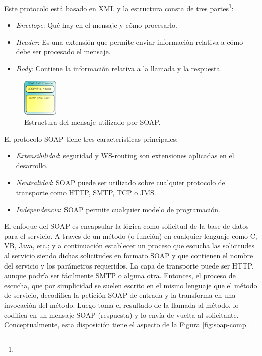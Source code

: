 \documentclass[conference]{IEEEtran}
\begin{document}
Este protocolo está basado en XML y la estructura consta de tres
partes\footnote{}:
\begin{itemize}
\item\emph{Envelope}: Qué hay en el mensaje y cómo procesarlo.
\item\emph{Header}: Es una extensión que permite enviar información
  relativa a cómo debe ser procesado el mensaje.
\item\emph{Body}: Contiene la información relativa a la llamada y la
  respuesta.
\end{itemize}

\begin{figure}[!t]
\centering
  \includegraphics[width=0.15\textwidth]{img/soap}
  \caption{Estructura del mensaje utilizado por SOAP.}
  \label{fig:soap-env}
\end{figure}

El protocolo SOAP tiene tres características principales:
\begin{itemize}
\item\emph{Extensibilidad}: seguridad y WS-routing son extensiones aplicadas
  en el desarrollo.
\item\emph{Neutralidad}: SOAP puede ser utilizado sobre cualquier protocolo
  de transporte como HTTP, SMTP, TCP o JMS.
\item\emph{Independencia}: SOAP permite cualquier modelo de programación.
\end{itemize}

El enfoque del SOAP\cite{SOA4} es encapsular la lógica como solicitud
de la base
de datos para el servicio. A traves de un método (o función) en
cualquier lenguaje como C, VB, Java, etc.; y a continuación establecer
un proceso que escucha las
solicitudes al servicio siendo dichas solicitudes en formato SOAP y
que contienen el nombre del servicio y los parámetros requeridos. La
capa de transporte puede ser HTTP, aunque podría ser fácilmente SMTP o
alguna otra. Entonces, el proceso de escucha, que por simplicidad se
suelen escrito en el mismo lenguaje que el método de servicio,
decodifica la petición SOAP de entrada y la transforma en una
invocación del método.
Luego toma el resultado de la llamada al método, lo codifica en un
mensaje SOAP (respuesta) y lo envía de vuelta al
solicitante. Conceptualmente, esta disposición tiene el aspecto de la
Figura \ref{fig:soap-comp}.
\end{document}
